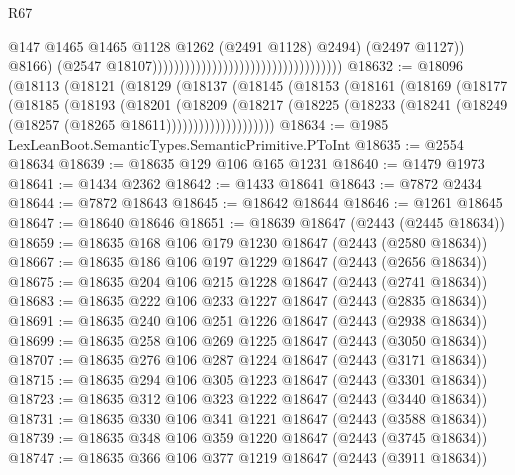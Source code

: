 \begin{lexlean}{R67}
\begin{coremodule}
                                                                              @147
                                                                              @1465
                                                                              @1465
                                                                              @1128
                                                                              @1262
                                                                              (@2491 @1128)
                                                                              @2494)
                                                                            (@2497 @1127))
                                                                          @8166)
                                                                        (@2547
                                                                          @18107)))))))))))))))))))))))))))))))))))
@18632 := @18096
    (@18113
      (@18121
        (@18129
          (@18137
            (@18145
              (@18153
                (@18161
                  (@18169
                    (@18177
                      (@18185
                        (@18193
                          (@18201
                            (@18209
                              (@18217
                                (@18225
                                  (@18233 (@18241 (@18249 (@18257 (@18265 @18611))))))))))))))))))))
@18634 := @1985 LexLeanBoot.SemanticTypes.SemanticPrimitive.PToInt
@18635 := @2554 @18634
@18639 := @18635 @129 @106 @165 @1231
@18640 := @1479 @1973
@18641 := @1434 @2362
@18642 := @1433 @18641
@18643 := @7872 @2434
@18644 := @7872 @18643
@18645 := @18642 @18644
@18646 := @1261 @18645
@18647 := @18640 @18646
@18651 := @18639 @18647 (@2443 (@2445 @18634))
@18659 := @18635 @168 @106 @179 @1230 @18647 (@2443 (@2580 @18634))
@18667 := @18635 @186 @106 @197 @1229 @18647 (@2443 (@2656 @18634))
@18675 := @18635 @204 @106 @215 @1228 @18647 (@2443 (@2741 @18634))
@18683 := @18635 @222 @106 @233 @1227 @18647 (@2443 (@2835 @18634))
@18691 := @18635 @240 @106 @251 @1226 @18647 (@2443 (@2938 @18634))
@18699 := @18635 @258 @106 @269 @1225 @18647 (@2443 (@3050 @18634))
@18707 := @18635 @276 @106 @287 @1224 @18647 (@2443 (@3171 @18634))
@18715 := @18635 @294 @106 @305 @1223 @18647 (@2443 (@3301 @18634))
@18723 := @18635 @312 @106 @323 @1222 @18647 (@2443 (@3440 @18634))
@18731 := @18635 @330 @106 @341 @1221 @18647 (@2443 (@3588 @18634))
@18739 := @18635 @348 @106 @359 @1220 @18647 (@2443 (@3745 @18634))
@18747 := @18635 @366 @106 @377 @1219 @18647 (@2443 (@3911 @18634))

\end{coremodule}
\end{lexlean}
